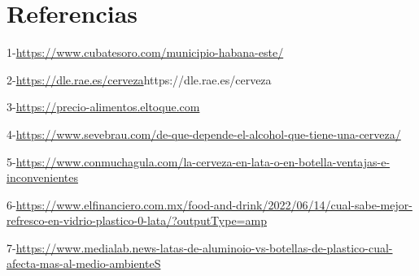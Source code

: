 \documentclass[a4paper,11pt]{article}
\begin{document}
\section{Referencias}
1-\url{https://www.cubatesoro.com/municipio-habana-este/}
\par\vspace{2pt}
2-\url{https://dle.rae.es/cerveza}{https://dle.rae.es/cerveza}
\par\vspace{2pt}
3-\url{https://precio-alimentos.eltoque.com}
\par\vspace{2pt}
4-\url{https://www.sevebrau.com/de-que-depende-el-alcohol-que-tiene-una-cerveza/}
\par\vspace{2pt}
5-\url{https://www.conmuchagula.com/la-cerveza-en-lata-o-en-botella-ventajas-e-inconvenientes}
\par\vspace{2pt}
6-\url{https://www.elfinanciero.com.mx/food-and-drink/2022/06/14/cual-sabe-mejor-refresco-en-vidrio-plastico-0-lata/?outputType=amp}
\par\vspace{2pt}
7-\url{https://www.medialab.news-latas-de-aluminoio-vs-botellas-de-plastico-cual-afecta-mas-al-medio-ambienteS}
\end{document}

